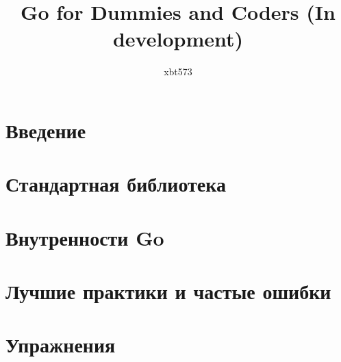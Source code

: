 \documentclass{article}
\title{Go for Dummies and Coders (In development)}
\author{xbt573}
\begin{document}
    \maketitle
    \newpage

    \tableofcontents
    \newpage

    \section{Введение}

    \section{Стандартная библиотека}

    \section{Внутренности Go}

    \section{Лучшие практики и частые ошибки}

    \section{Упражнения}
\end{document}
